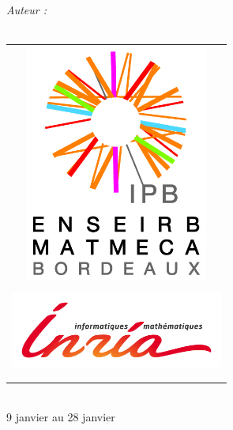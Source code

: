 \begin{titlepage}
\begin{flushleft} 
  \large
  \emph{Auteur :}\\
  \reportauthor\\
\end{flushleft}
\begin{center}
  
  \begin{center}
    \begin{tabular}{c}
      \\
      \includegraphics [width=60mm]{Images/ENSEIRB-MATMECA.jpg} \\
      \\
      \includegraphics [width=70mm]{Images/logo-INRIA.jpg}\\
      \\
      \\
    \end{tabular}
    
    
      
    \textsc{\Large \reportsubject}\\[0.5cm]
           {\large 9 janvier au 28 janvier}\\
           
           
           \HRule \\[0.4cm]
                  {\huge \bfseries \reporttitle}\\[0.4cm]
                  \HRule \\[1.5cm]
                  

\end{center}
\end{center}
\end{titlepage}
